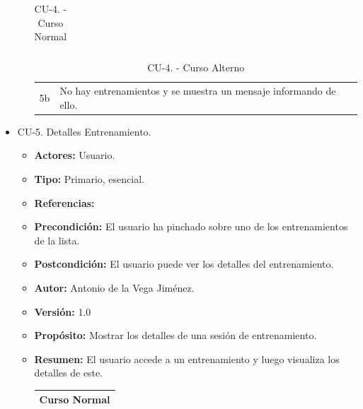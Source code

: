 \begin{itemize}
\begin{itemize}
\begin{table}[H]
\begin{tabularx}{\textwidth}{|l|X|l|X|}
      \end{tabularx}
      \caption{CU-4. - Curso Normal}
      \label{my-label}
    \end{table}
    \begin{table}[H]
      \centering
      \begin{tabularx}{\textwidth}{|l|X|}
       \hline
       \rowcolor[HTML]{C0C0C0} 
       \multicolumn{2}{|l|}{\cellcolor[HTML]{C0C0C0}Curso Alterno} \\ \hline
       \rowcolor[HTML]{FFFFFF} 
              5b                      & No hay entrenamientos y se muestra un mensaje informando de ello.                           \\ \hline
      \end{tabularx}
      \caption{CU-4. - Curso Alterno}
      \label{my-label}
    \end{table}
  \end{itemize}
  \item CU-5. Detalles Entrenamiento.
  \begin{itemize}
    \item \textbf{Actores:} Usuario.
    \item \textbf{Tipo:} Primario, esencial.
    \item \textbf{Referencias:}
    \item \textbf{Precondición:} El usuario ha pinchado sobre uno de los entrenamientos de la lista.
    \item \textbf{Postcondición:} El usuario puede ver los detalles del entrenamiento.
    \item \textbf{Autor:} Antonio de la Vega Jiménez.
    \item \textbf{Versión:} 1.0
    \item \textbf{Propósito:} Mostrar los detalles de una sesión de entrenamiento.
    \item \textbf{Resumen:} El usuario accede a un entrenamiento y luego visualiza los detalles de este.
    \begin{table}[H]
      \centering
      \begin{tabularx}{\textwidth}{|l|X|l|X|}
        \hline
        \multicolumn{4}{|c|}{\cellcolor[HTML]{C0C0C0}Curso Normal}                                                 \\ \hline

\end{tabularx}
\end{table}
\end{itemize}
\end{itemize}
